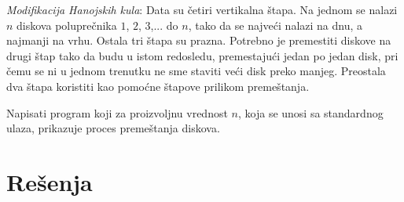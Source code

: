 \begin{Exercise}[difficulty=1, label=1_37]%
{\em Modifikacija Hanojskih kula}: Data su četiri
  vertikalna štapa. Na jednom se nalazi $n$ diskova poluprečnika
  $1$, $2$, $3$,... do $n$, tako da se najveći nalazi na dnu, a
  najmanji na vrhu. Ostala tri štapa su prazna. Potrebno je
  premestiti diskove na drugi štap tako da budu u istom redosledu,
  premestajući jedan po jedan disk, pri čemu se ni u jednom
  trenutku ne sme staviti veći disk preko manjeg. Preostala dva 
  štapa koristiti kao pomoćne štapove prilikom
  premeštanja.
  
\noindent  Napisati program koji za proizvoljnu vrednost $n$, koja se unosi sa standardnog ulaza, prikazuje proces premeštanja diskova.

\end{Exercise}

\section{Rešenja}
\shipoutAnswer
